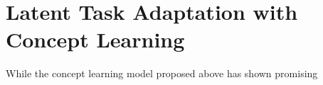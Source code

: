 \section{Latent Task Adaptation with Concept Learning}
While the concept learning model proposed above has shown promising 